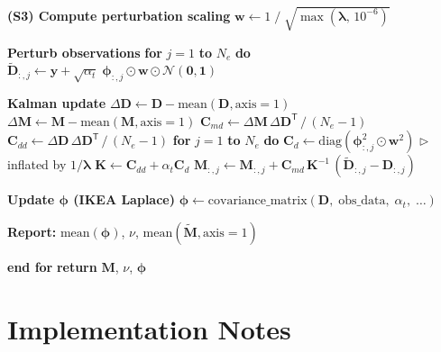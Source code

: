 \documentclass[article,nojss]{jss}
\begin{document}
\begin{algorithm}[tbp]
\begin{algorithmic}[1]
\STATE \quad \textbf{(S3) Compute perturbation scaling}
\STATE \quad\quad $\mathbf{w} \gets 1 \;/\; \sqrt{\max(\boldsymbol{\lambda},\, 10^{-6})}$

\STATE \quad \textbf{Perturb observations}
\STATE \quad\quad \textbf{for} $j = 1$ \textbf{to} $N_e$ \textbf{do}
\STATE \quad\quad\quad $\tilde{\mathbf{D}}_{:,j} \gets \mathbf{y} +
                         \sqrt{\alpha_t}\; \boldsymbol{\phi}_{:,j} \odot \mathbf{w} \odot
                         \mathcal{N}(\mathbf{0}, \mathbf{1})$

\STATE \quad \textbf{Kalman update}
\STATE \quad\quad $\Delta\mathbf{D} \gets \mathbf{D} - \text{mean}(\mathbf{D}, \text{axis}=1)$
\STATE \quad\quad $\Delta\mathbf{M} \gets \mathbf{M} - \text{mean}(\mathbf{M}, \text{axis}=1)$
\STATE \quad\quad $\mathbf{C}_{md} \gets \Delta\mathbf{M} \,
                          \Delta\mathbf{D}^{\mathsf{T}} \,/\, (N_e - 1)$
\STATE \quad\quad $\mathbf{C}_{dd} \gets \Delta\mathbf{D} \,
                          \Delta\mathbf{D}^{\mathsf{T}} \,/\, (N_e - 1)$
\STATE \quad\quad \textbf{for} $j = 1$ \textbf{to} $N_e$ \textbf{do}
\STATE \quad\quad\quad $\mathbf{C}_d \gets \text{diag}(\boldsymbol{\phi}_{:,j}^2 \odot
                             \mathbf{w}^2)$
                             \hfill $\triangleright$ inflated by $1/\boldsymbol{\lambda}$
\STATE \quad\quad\quad $\mathbf{K} \gets \mathbf{C}_{dd} + \alpha_t \mathbf{C}_d$
\STATE \quad\quad\quad $\mathbf{M}_{:,j} \gets \mathbf{M}_{:,j} +
                             \mathbf{C}_{md} \, \mathbf{K}^{-1} \,
                             (\tilde{\mathbf{D}}_{:,j} - \mathbf{D}_{:,j})$

\STATE \quad \textbf{Update $\boldsymbol{\phi}$ (IKEA Laplace)}
\STATE \quad\quad $\boldsymbol{\phi} \gets \text{covariance\_matrix}(
                         \mathbf{D},\; \text{obs\_data},\; \alpha_t,\; \ldots)$

\STATE \quad \textbf{Report:}
         $\text{mean}(\boldsymbol{\phi})$, $\nu$,
         $\text{mean}(\tilde{\mathbf{M}}, \text{axis}=1)$

\STATE \textbf{end for}
\STATE \textbf{return} $\mathbf{M}$, $\nu$, $\boldsymbol{\phi}$
\end{algorithmic}
\end{algorithm}

\section{Implementation Notes}
\end{document}
